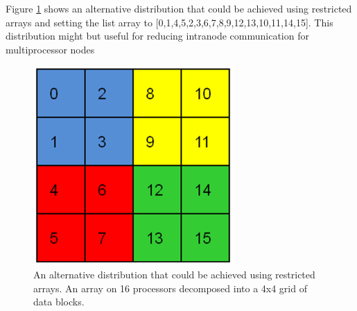 Figure \ref{fig:GA-16-An-alternative-distribution} shows an alternative
distribution that could be achieved using restricted arrays and setting
the list array to {[}0,1,4,5,2,3,6,7,8,9,12,13,10,11,14,15{]}. This
distribution might but useful for reducing intranode communication
for multiprocessor nodes 

%
\begin{figure}
\begin{centering}
\includegraphics[width=3in]{GAon16ProcessorsAlternative}
\par\end{centering}

\caption{\label{fig:GA-16-An-alternative-distribution}An alternative distribution
that could be achieved using restricted arrays. An array on 16 processors
decomposed into a 4x4 grid of data blocks. }



\end{figure}




